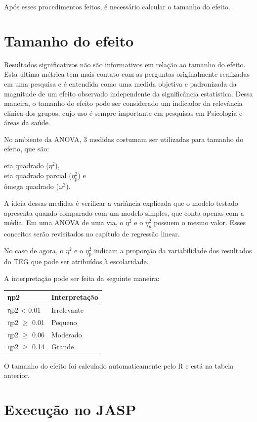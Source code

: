 \documentclass[
]{book}
\begin{document}
Após esses procedimentos feitos, é necessário calcular o tamanho do efeito.

\hypertarget{tamanho-do-efeito-3}{%
\section{Tamanho do efeito}\label{tamanho-do-efeito-3}}

Resultados significativos não são informativos em relação ao tamanho do efeito. Esta última métrica tem mais contato com as perguntas originalmente realizadas em uma pesquisa e é entendida como uma medida objetiva e padronizada da magnitude de um efeito observado independente da significância estatística. Dessa maneira, o tamanho do efeito pode ser considerado um indicador da relevância clínica dos grupos, cujo uso é sempre importante em pesquisas em Psicologia e áreas da saúde.

No ambiente da ANOVA, 3 medidas costumam ser utilizadas para tamanho do efeito, que são:

eta quadrado (\(\eta^2\)),\\
eta quadrado parcial (\(\eta_p^2\)) e\\
ômega quadrado (\(\omega^2\)).

A ideia dessas medidas é verificar a variância explicada que o modelo testado apresenta quando comparado com um modelo simples, que conta apenas com a média. Em uma ANOVA de uma via, o \(\eta^2\) e o \(\eta_p^2\) possuem o mesmo valor. Esses conceitos serão revisitados no capítulo de regressão linear.

No caso de agora, o \(\eta^2\) e o \(\eta_p^2\) indicam a proporção da variabilidade dos resultados do TEG que pode ser atribuídos à escolaridade.

A interpretação pode ser feita da seguinte maneira:

\begin{longtable}[]{@{}ll@{}}
\toprule
ηp2 & Interpretação\tabularnewline
\midrule
\endhead
ηp2 \textless{} 0.01 & Irrelevante\tabularnewline
ηp2 \(\geq\) 0.01 & Pequeno\tabularnewline
ηp2 \(\geq\) 0.06 & Moderado\tabularnewline
ηp2 \(\geq\) 0.14 & Grande\tabularnewline
\bottomrule
\end{longtable}

O tamanho do efeito foi calculado automaticamente pelo R e está na tabela anterior.

\hypertarget{execuuxe7uxe3o-no-jasp-6}{%
\section{Execução no JASP}\label{execuuxe7uxe3o-no-jasp-6}}
\end{document}
